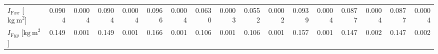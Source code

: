 \documentclass[../report/parameterReport.tex]{subfiles}
\begin{document}
\begin{landscape}
\begin{table}[tb]
\begin{center}
{\begin{tabular}{l|rr|rr|rr|rr|rr|rr|rr|rr}
\emph{$I_{\mathrm{F}xx}$} [$\mathrm{kg\ m}^2$] & 0.0904 & 0.0004 & 0.0904 & 0.0004 & 0.0966 & 0.0004 & 0.0630 & 0.0003 & 0.0552 & 0.0002 & 0.0939 & 0.0004 & 0.0877 & 0.0004 & 0.0877 & 0.0004\\
\emph{$I_{\mathrm{F}yy}$} [$\mathrm{kg\ m}^2$] & 0.149 & 0.001 & 0.149 & 0.001 & 0.166 & 0.001 & 0.106 & 0.001 & 0.106 & 0.001 & 0.157 & 0.001 & 0.147 & 0.002 & 0.147 & 0.002\\
\end{tabular}
}
\end{center}
\end{table}
\end{landscape}
\end{document}
